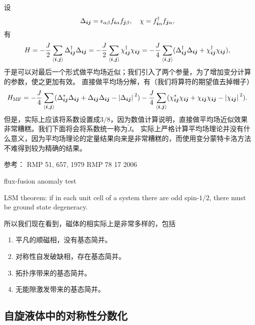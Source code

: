 设
\begin{equation}
    {\Delta}_{\vb*{i} \vb*{j}} = \epsilon_{\alpha \beta} {f}_{\vb*{i} \alpha} {f}_{\vb*{j} \beta}, \quad {\chi} = {f}^\dagger_{\vb*{i} \alpha} {f}_{\vb*{j} \alpha},
\end{equation}
有
\begin{equation}
    {H} = - \frac{J}{2} \sum_{\langle \vb*{i}, \vb*{j} \rangle} {\Delta}^\dagger_{\vb*{i} \vb*{j}} {\Delta}_{\vb*{i} \vb*{j}} = - \frac{J}{2} \sum_{\langle \vb*{i}, \vb*{j} \rangle} {\chi}_{\vb*{i} \vb*{j}}^\dagger {\chi}_{\vb*{i} \vb*{j}} = - \frac{J}{4} \sum_{\langle \vb*{i}, \vb*{j} \rangle} ({\Delta}^\dagger_{\vb*{i} \vb*{j}} {\Delta}_{\vb*{i} \vb*{j}} + {\chi}^\dagger_{\vb*{i} \vb*{j}} {\chi}_{\vb*{i} \vb*{j}}),
\end{equation}
于是可以对最后一个形式做平均场近似；我们引入了两个参量，为了增加变分计算的参数，使之更加有效。
直接做平均场分解，有（我们将算符的期望值去掉帽子）
\[
    {H}_\text{MF} = - \frac{J}{4} \sum_{\langle \vb*{i}, \vb*{j} \rangle} (\Delta_{\vb*{i} \vb*{j}}^* {\Delta}_{\vb*{i} \vb*{j}} + {\Delta}_{\vb*{i} \vb*{j}} \Delta_{\vb*{i} \vb*{j}} - \abs*{\Delta_{\vb*{i} \vb*{j}}}^2) - \frac{J}{4} \sum_{\langle \vb*{i}, \vb*{j} \rangle} (\chi_{\vb*{i} \vb*{j}}^* {\chi}_{\vb*{i} \vb*{j}} + {\chi}_{\vb*{i} \vb*{j}} \chi_{\vb*{i} \vb*{j}} - \abs*{\chi_{\vb*{i} \vb*{j}}}^2).
\]
但是，实际上应该将系数设置成$3/8$，因为数值计算说明，直接做平均场近似效果非常糟糕。我们下面将会将系数统一称为$\tilde{J}$。
实际上严格计算平均场理论并没有什么意义，因为平均场理论的定量结果向来是非常糟糕的，而使用变分蒙特卡洛方法不难得到较为精确的结果。

参考： 
RMP 51, 657, 1979
RMP 78 17 2006

flux-fusion anomaly test

LSM theorem: if in each unit cell of a system there are odd spin-$1/2$, there must be ground state degeneracy.

所以我们现在看到，磁体的相实际上是非常多样的，包括
\begin{enumerate}
    \item 平凡的顺磁相，没有基态简并。
    \item 对称性自发破缺相，存在基态简并。
    \item 拓扑序带来的基态简并。
    \item 无能隙激发带来的基态简并。
\end{enumerate}

\subsection{自旋液体中的对称性分数化}

